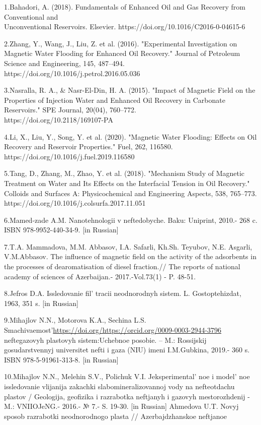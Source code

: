 \begin{references}
1.Bahadori, A. (2018). Fundamentals of Enhanced Oil and Gas Recovery
from Conventional and \\Unconventional Reservoirs. Elsevier.
https://doi.org/10.1016/C2016-0-04615-6

2.Zhang, Y., Wang, J., Liu, Z. et al. (2016). "Experimental
Investigation on Magnetic Water Flooding for Enhanced Oil Recovery."
Journal of Petroleum Science and Engineering, 145, 487--494.\\
https://doi.org/10.1016/j.petrol.2016.05.036

3.Nasralla, R. A., \& Nasr-El-Din, H. A. (2015). "Impact of Magnetic
Field on the Properties of Injection Water and Enhanced Oil Recovery in
Carbonate Reservoirs." SPE Journal, 20(04), 760--772.\\
https://doi.org/10.2118/169107-PA

4.Li, X., Liu, Y., Song, Y. et al. (2020). "Magnetic Water Flooding:
Effects on Oil Recovery and Reservoir Properties." Fuel, 262, 116580.
https://doi.org/10.1016/j.fuel.2019.116580

5.Tang, D., Zhang, M., Zhao, Y. et al. (2018). "Mechanism Study of
Magnetic Treatment on Water and Its Effects on the Interfacial Tension
in Oil Recovery." Colloids and Surfaces A: Physicochemical and
Engineering Aspects, 538, 765--773.
https://doi.org/10.1016/j.colsurfa.2017.11.051

6.Mamed-zade A.M. Nanotehnologii v neftedobyche. Baku: Uniprint, 2010.-
268 c. ISBN 978-9952-440-34-9. {[}in Russian{]}

7.T.A. Mammadova, M.M. Abbasov, I.A. Safarli, Kh.Sh. Teyubov, N.E.
Asgarli, V.M.Abbasov. The influence of magnetic field on the activity of
the adsorbents in the processes of dearomatisation of diesel fraction.//
The reports of national academy of sciences of Azerbaijan.-
2017.-Vol.73(1) - P. 48-51.

8.Jefros D.A. Issledovanie fil' tracii neodnorodnyh
sistem. L. Gostoptehizdat, 1963, 351 s. {[}in Russian{]}

9.Mihajlov N.N., Motorova K.A., Sechina L.S.
Smachivaemost'{\href{https://doi.org/https://orcid.org/0009-0003-2944-3796}{https://doi.org/https://orcid.org/0009-0003-2944-3796}} neftegazovyh plastovyh sistem:Uchebnoe
posobie. -- M.: Rossijskij gosudarstvennyj universitet nefti i gaza
(NIU) imeni I.M.Gubkina, 2019.- 360 s. ISBN 978-5-91961-313-8. {[}in
Russian{]}

10.Mihajlov N.N., Melehin S.V., Polichuk V.I.
Jeksperimental' noe i model' noe
issledovanie vlijanija zakachki slabomineralizovannoj vody na
nefteotdachu plastov / Geologija, geofizika i razrabotka neftjanyh i
gazovyh mestorozhdenij -M.: VNIIOJeNG.- 2016.- № 7.- S. 19-30. {[}in
Russian{]} Ahmedova U.T. Novyj sposob razrabotki neodnorodnogo plasta //
Azerbajdzhanskoe neftjanoe


\end{references}
